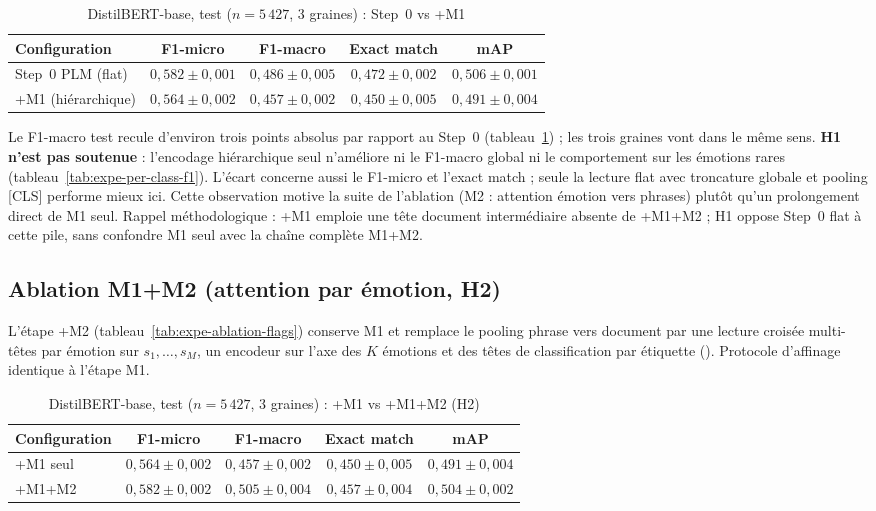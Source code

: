 \begin{table}[H]
\centering
\caption{DistilBERT-base, test ($n{=}5\,427$, 3 graines) : Step~0 vs +M1}
\label{tab:expe-m1-distilbert}
\renewcommand{\arraystretch}{1.2}
\begin{tabular}{|l|c|c|c|c|}
\hline
\textbf{Configuration} & \textbf{F1-micro} & \textbf{F1-macro} & \textbf{Exact match} & \textbf{mAP} \\
\hline
Step~0 PLM (flat) & $0{,}582 \pm 0{,}001$ & $0{,}486 \pm 0{,}005$ & $0{,}472 \pm 0{,}002$ & $0{,}506 \pm 0{,}001$ \\
\hline
+M1 (hiérarchique) & $0{,}564 \pm 0{,}002$ & $0{,}457 \pm 0{,}002$ & $0{,}450 \pm 0{,}005$ & $0{,}491 \pm 0{,}004$ \\
\hline
\end{tabular}
\end{table}

Le F1-macro test recule d'environ trois points absolus par rapport au
Step~0 (tableau~\ref{tab:expe-m1-distilbert}) ; les trois graines vont
dans le même sens. \textbf{H1 n'est pas soutenue} : l'encodage
hiérarchique seul n'améliore ni le F1-macro global ni le comportement
sur les émotions rares (tableau~\ref{tab:expe-per-class-f1}). L'écart
concerne aussi le F1-micro et l'exact match ; seule la lecture flat avec
troncature globale et pooling [CLS] performe mieux ici.
Cette observation motive la suite de l'ablation (M2 : attention
émotion vers phrases) plutôt qu'un prolongement direct de M1 seul.
Rappel méthodologique : +M1 emploie une tête document intermédiaire
absente de +M1+M2 ; H1 oppose Step~0 flat à cette pile, sans confondre
M1 seul avec la chaîne complète M1+M2.

\subsection{Ablation M1+M2 (attention par émotion, H2)}
\label{sec:expe-m1-m2-h2}

L'étape +M2 (tableau~\ref{tab:expe-ablation-flags}) conserve M1 et
remplace le pooling phrase vers document par une lecture croisée
multi-têtes par émotion sur $s_1,\dots,s_M$, un encodeur sur l'axe
des $K$ émotions et des têtes de classification par étiquette
(). Protocole d'affinage identique à
l'étape M1.

\begin{table}[H]
\centering
\caption{DistilBERT-base, test ($n{=}5\,427$, 3 graines) : +M1 vs +M1+M2 (H2)}
\label{tab:expe-m1-m2-distilbert}
\renewcommand{\arraystretch}{1.2}
\begin{tabular}{|l|c|c|c|c|}
\hline
\textbf{Configuration} & \textbf{F1-micro} & \textbf{F1-macro} & \textbf{Exact match} & \textbf{mAP} \\
\hline
+M1 seul & $0{,}564 \pm 0{,}002$ & $0{,}457 \pm 0{,}002$ & $0{,}450 \pm 0{,}005$ & $0{,}491 \pm 0{,}004$ \\
\hline
+M1+M2 & $0{,}582 \pm 0{,}002$ & $0{,}505 \pm 0{,}004$ & $0{,}457 \pm 0{,}004$ & $0{,}504 \pm 0{,}002$ \\
\hline
\end{tabular}
\end{table}

